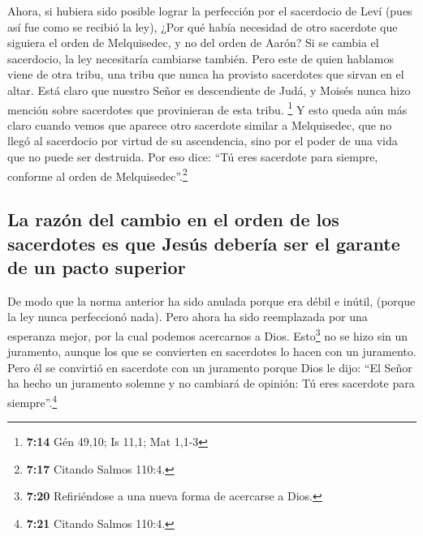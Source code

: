 Ahora, si hubiera sido posible lograr la perfección por
el sacerdocio de Leví (pues así fue como se recibió la ley), ¿Por qué
había necesidad de otro sacerdote que siguiera el orden de Melquisedec,
y no del orden de Aarón?  Si se cambia el sacerdocio, la
ley necesitaría cambiarse también.  Pero este de quien
hablamos viene de otra tribu, una tribu que nunca ha provisto sacerdotes
que sirvan en el altar.  Está claro que nuestro Señor es
descendiente de Judá, y Moisés nunca hizo mención sobre sacerdotes que
provinieran de esta tribu. \footnote{\textbf{7:14} Gén 49,10; Is 11,1;
  Mat 1,1-3}  Y esto queda aún más claro cuando vemos que
aparece otro sacerdote similar a Melquisedec,  que no
llegó al sacerdocio por virtud de su ascendencia, sino por el poder de
una vida que no puede ser destruida.  Por eso dice: ``Tú
eres sacerdote para siempre, conforme al orden de
Melquisedec''.\footnote{\textbf{7:17} Citando Salmos 110:4.}

\hypertarget{la-razuxf3n-del-cambio-en-el-orden-de-los-sacerdotes-es-que-jesuxfas-deberuxeda-ser-el-garante-de-un-pacto-superior}{%
\subsection{La razón del cambio en el orden de los sacerdotes es que
Jesús debería ser el garante de un pacto
superior}\label{la-razuxf3n-del-cambio-en-el-orden-de-los-sacerdotes-es-que-jesuxfas-deberuxeda-ser-el-garante-de-un-pacto-superior}}

 De modo que la norma anterior ha sido anulada porque era
débil e inútil,  (porque la ley nunca perfeccionó nada).
Pero ahora ha sido reemplazada por una esperanza mejor, por la cual
podemos acercarnos a Dios.  Esto\footnote{\textbf{7:20}
  Refiriéndose a una nueva forma de acercarse a Dios.} no se hizo sin un
juramento, aunque los que se convierten en sacerdotes lo hacen con un
juramento.  Pero él se convirtió en sacerdote con un
juramento porque Dios le dijo: ``El Señor ha hecho un juramento solemne
y no cambiará de opinión: Tú eres sacerdote para siempre''.\footnote{\textbf{7:21}
  Citando Salmos 110:4.}

